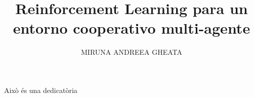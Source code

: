 \documentclass[spanish,GINF]{TFGEPSUIB}
\title{Reinforcement Learning para un entorno cooperativo multi-agente}
\author{\MakeUppercase{Miruna Andreea Gheata}}
\begin{document}
\portada

\frontmatter


\maketitle

\cleartorecto \thispagestyle{empty}
\begin{agraiments}
Això és una dedicatòria %
\end{agraiments}

\cleartorecto \tableofcontents

\cleartorecto \listoffigures
\cleartorecto \listoftables 

% 

 

\mainmatter\pagestyle{ruled}
















\appendix 


\backmatter



 
\end{document}
